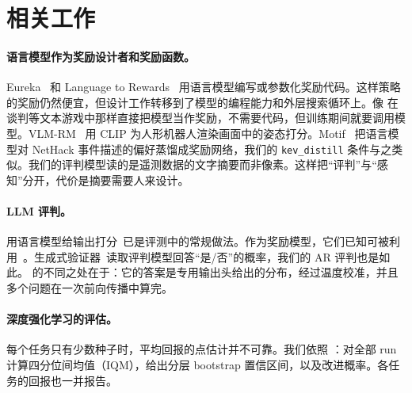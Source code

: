 \section{相关工作}\label{sec:related}

\paragraph{语言模型作为奖励设计者和奖励函数。} Eureka~\cite{ma2024eureka} 和 Language to Rewards~\cite{yu2023language} 用语言模型编写或参数化奖励代码。这样策略的奖励仍然便宜，但设计工作转移到了模型的编程能力和外层搜索循环上。像 \citet{kwon2023reward} 在谈判等文本游戏中那样直接把模型当作奖励，不需要代码，但训练期间就要调用模型。VLM-RM~\cite{rocamonde2024vlm} 用 CLIP 为人形机器人渲染画面中的姿态打分。Motif~\cite{klissarov2024motif} 把语言模型对 NetHack 事件描述的偏好蒸馏成奖励网络，我们的 \texttt{kev\_distill} 条件与之类似。我们的评判模型读的是遥测数据的文字摘要而非像素。这样把“评判”与“感知”分开，代价是摘要需要人来设计。

\paragraph{LLM 评判。} 用语言模型给输出打分~\cite{zheng2023judging,liu2023geval}已是评测中的常规做法。作为奖励模型，它们已知可被利用~\cite{gao2023scaling,skalse2022defining}。生成式验证器~\cite{zhang2024genverifier}读取评判模型回答“是/否”的概率，我们的 AR 评判也是如此。\kev{} 的不同之处在于：它的答案是专用输出头给出的分布，经过温度校准，并且多个问题在一次前向传播中算完。

\paragraph{深度强化学习的评估。} 每个任务只有少数种子时，平均回报的点估计并不可靠。我们依照 \citet{agarwal2021deep}：对全部 run 计算四分位间均值（IQM），给出分层 bootstrap 置信区间，以及改进概率。各任务的回报也一并报告。
